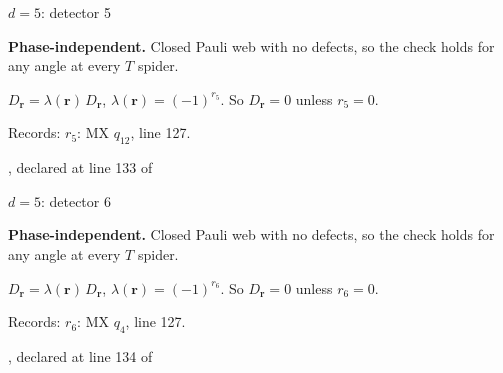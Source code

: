 \label{d5_det005}
{\Large $d=5$: detector 5}\par
\textbf{Phase-independent.} Closed Pauli web with no defects, so the check holds for any angle at every $T$ spider.
\begin{center}
\end{center}
\vspace{-1mm}
$D_{\boldsymbol r}=\lambda(\boldsymbol r)\,D_{\boldsymbol r}$, \quad $\lambda(\boldsymbol r)=(-1)^{r_{5}}$. \qquad So $D_{\boldsymbol r}=0$ unless $r_{5}=0$.
\par\smallskip\begin{minipage}{.98\linewidth}\small Records: $r_{5}$: MX $q_{12}$, line 127.\end{minipage}
\vfill
{\footnotesize\texttt{}, declared at line 133 of \texttt{}}
\newpage

\label{d5_det006}
{\Large $d=5$: detector 6}\par
\textbf{Phase-independent.} Closed Pauli web with no defects, so the check holds for any angle at every $T$ spider.
\begin{center}
\end{center}
\vspace{-1mm}
$D_{\boldsymbol r}=\lambda(\boldsymbol r)\,D_{\boldsymbol r}$, \quad $\lambda(\boldsymbol r)=(-1)^{r_{6}}$. \qquad So $D_{\boldsymbol r}=0$ unless $r_{6}=0$.
\par\smallskip\begin{minipage}{.98\linewidth}\small Records: $r_{6}$: MX $q_{4}$, line 127.\end{minipage}
\vfill
{\footnotesize\texttt{}, declared at line 134 of \texttt{}}
\newpage


